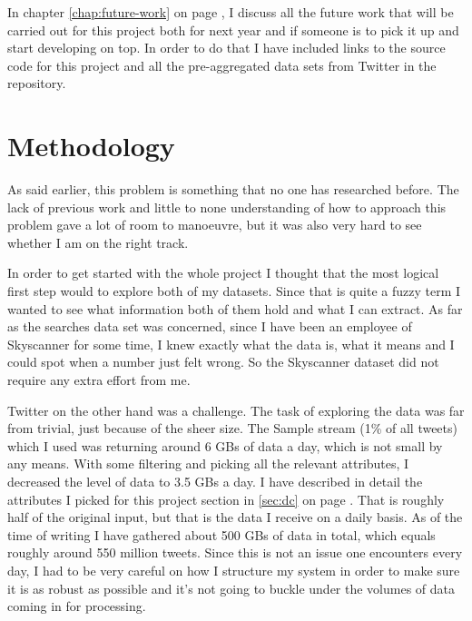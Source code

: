 \documentclass[minf,frontabs,twoside,singlespacing,parskip]{infthesis}
\begin{document}
In chapter \ref{chap:future-work} on page \pageref{chap:future-work}, I discuss all the future work that will be carried out for this project both for next year and if someone is to pick it up and start developing on top. In order to do that I have included links to the source code for this project and all the pre-aggregated data sets from Twitter in the repository.



\chapter{Methodology}
\label{chap:method}


As said earlier, this problem is something that no one has researched before. The lack of previous work and little to none understanding of how to approach this problem gave a lot of room to manoeuvre, but it was also very hard to see whether I am on the right track.


In order to get started with the whole project I thought that the most logical first step would to explore both of my datasets. Since that is quite a fuzzy term I wanted to see what information both of them hold and what I can extract. As far as the searches data set was concerned, since I have been an employee of Skyscanner for some time, I knew exactly what the data is, what it means and I could spot when a number just felt wrong. So the Skyscanner dataset did not require any extra effort from me. 


Twitter on the other hand was a challenge. The task of exploring the data was far from trivial, just because of the sheer size. The Sample stream (1\% of all tweets) which I used \cite{samplestream} was returning around 6 GBs of data a day, which is not small by any means. With some filtering and picking all the relevant attributes, I decreased the level of data to 3.5 GBs a day. I have described in detail the attributes I picked for this project section in \ref{sec:dc} on page \pageref{sec:dc}. That is roughly half of the original input, but that is the data I receive on a daily basis. As of the time of writing I have gathered about 500 GBs of data in total, which equals roughly around 550 million tweets. Since this is not an issue one encounters every day, I had to be very careful on how I structure my system in order to make sure it is as robust as possible and it's not going to buckle under the volumes of data coming in for processing. 
\end{document}
